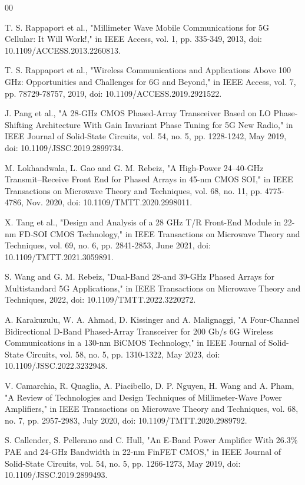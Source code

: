 \documentclass{IEEEtran}
\begin{document}
\begin{thebibliography}{00}

T. S. Rappaport et al., "Millimeter Wave Mobile Communications for 5G Cellular: It Will Work!," in IEEE Access, vol. 1, pp. 335-349, 2013, doi: 10.1109/ACCESS.2013.2260813.


T. S. Rappaport et al., "Wireless Communications and Applications Above 100 GHz: Opportunities and Challenges for 6G and Beyond," in IEEE Access, vol. 7, pp. 78729-78757, 2019, doi: 10.1109/ACCESS.2019.2921522.

J. Pang et al., "A 28-GHz CMOS Phased-Array Transceiver Based on LO Phase-Shifting Architecture With Gain Invariant Phase Tuning for 5G New Radio," in IEEE Journal of Solid-State Circuits, vol. 54, no. 5, pp. 1228-1242, May 2019, doi: 10.1109/JSSC.2019.2899734.


M. Lokhandwala, L. Gao and G. M. Rebeiz, "A High-Power 24–40-GHz Transmit–Receive Front End for Phased Arrays in 45-nm CMOS SOI," in IEEE Transactions on Microwave Theory and Techniques, vol. 68, no. 11, pp. 4775-4786, Nov. 2020, doi: 10.1109/TMTT.2020.2998011.

X. Tang et al., "Design and Analysis of a 28 GHz T/R Front-End Module in 22-nm FD-SOI CMOS Technology," in IEEE Transactions on Microwave Theory and Techniques, vol. 69, no. 6, pp. 2841-2853, June 2021, doi: 10.1109/TMTT.2021.3059891.

S. Wang and G. M. Rebeiz, "Dual-Band 28-and 39-GHz Phased Arrays for Multistandard 5G Applications," in IEEE Transactions on Microwave Theory and Techniques, 2022, doi: 10.1109/TMTT.2022.3220272.

A. Karakuzulu, W. A. Ahmad, D. Kissinger and A. Malignaggi, "A Four-Channel Bidirectional D-Band Phased-Array Transceiver for 200 Gb/s 6G Wireless Communications in a 130-nm BiCMOS Technology," in IEEE Journal of Solid-State Circuits, vol. 58, no. 5, pp. 1310-1322, May 2023, doi: 10.1109/JSSC.2022.3232948.

V. Camarchia, R. Quaglia, A. Piacibello, D. P. Nguyen, H. Wang and A. Pham, "A Review of Technologies and Design Techniques of Millimeter-Wave Power Amplifiers," in IEEE Transactions on Microwave Theory and Techniques, vol. 68, no. 7, pp. 2957-2983, July 2020, doi: 10.1109/TMTT.2020.2989792.

S. Callender, S. Pellerano and C. Hull, "An  E-Band Power Amplifier With 26.3\% PAE and 24-GHz Bandwidth in 22-nm FinFET CMOS," in IEEE Journal of Solid-State Circuits, vol. 54, no. 5, pp. 1266-1273, May 2019, doi: 10.1109/JSSC.2019.2899493.


\end{thebibliography}
\end{document}
